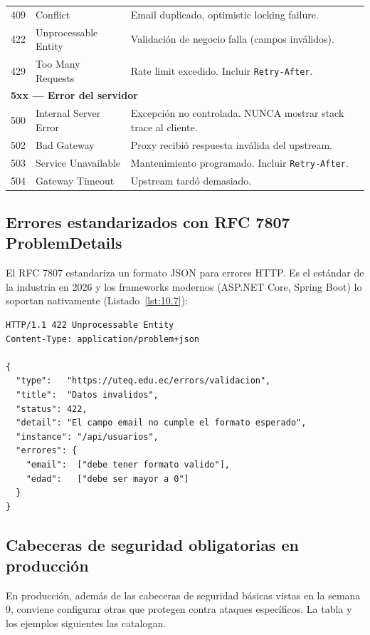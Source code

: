 \begin{table}[htbp]
\begin{tabularx}{\textwidth}{llX}
409 & Conflict            & Email duplicado, optimistic locking failure.\\
422 & Unprocessable Entity & Validación de negocio falla (campos inválidos).\\
429 & Too Many Requests   & Rate limit excedido. Incluir \texttt{Retry-After}.\\
\midrule
\multicolumn{3}{l}{\textbf{5xx --- Error del servidor}}\\
500 & Internal Server Error & Excepción no controlada. NUNCA mostrar stack trace al cliente.\\
502 & Bad Gateway         & Proxy recibió respuesta inválida del upstream.\\
503 & Service Unavailable & Mantenimiento programado. Incluir \texttt{Retry-After}.\\
504 & Gateway Timeout     & Upstream tardó demasiado.\\
\bottomrule
\end{tabularx}
\end{table}

\subsection{Errores estandarizados con RFC 7807 ProblemDetails}

El RFC 7807 \cite{rfc7807} estandariza un formato JSON para errores
HTTP. Es el estándar de la industria en 2026 y los frameworks modernos
(ASP.NET Core, Spring Boot) lo soportan nativamente (Listado~\ref{lst:10.7}):

\begin{lstlisting}[style=js,numbers=none,caption={Respuesta de error según RFC 7807},label=lst:10.7]
HTTP/1.1 422 Unprocessable Entity
Content-Type: application/problem+json

{
  "type":   "https://uteq.edu.ec/errors/validacion",
  "title":  "Datos invalidos",
  "status": 422,
  "detail": "El campo email no cumple el formato esperado",
  "instance": "/api/usuarios",
  "errores": {
    "email":  ["debe tener formato valido"],
    "edad":   ["debe ser mayor a 0"]
  }
}
\end{lstlisting}

\subsection{Cabeceras de seguridad obligatorias en producción}

En producción, además de las cabeceras de seguridad básicas
vistas en la semana 9, conviene configurar otras que protegen contra
ataques específicos. La tabla y los ejemplos siguientes las catalogan.


